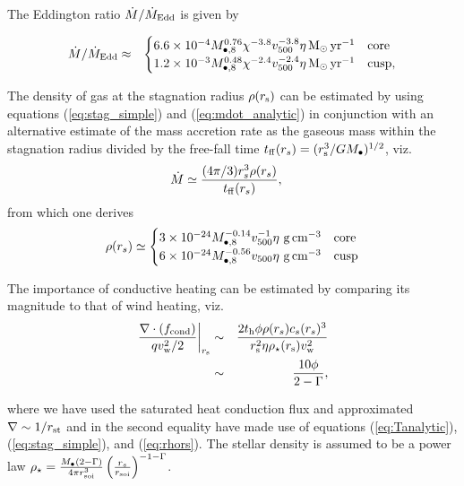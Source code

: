 \documentclass[usenatbib,fleqn]{mn2e}
\newcommand{\eddr}{\dot{M}/\dot{M}_{\rm Edd}}
\newcommand{\rs}{r_s}
\newcommand{\Mbh}[1][]{M_{\bullet#1}}
\newcommand{\Mbheight}{M_{\bullet,8}}
\newcommand{\soi}{\rm soi}
\newcommand{\rsoi}{r_{\soi}}
\newcommand{\ff}{\rm ff}
\newcommand{\pyear}{{\rm yr}^{-1}}
\begin{document}
The Eddington ratio $\eddr$ is given by 

\begin{eqnarray}
\eddr&\approx&
  \begin{cases}
    6.6 \times 10^{-4} M_{\bullet,8}^{0.76}
    \chi^{-3.8} v_{500}^{-3.8}  \eta \Msun \, \pyear& \text{core} \\
    1.2 \times 10^{-3} \Mbheight^{0.48} 
    \chi^{-2.4} v_{500}^{-2.4}  \eta \Msun \, \pyear  & \text{cusp}, 
  \end{cases}
  \label{eq:eddr_analytic}
\end{eqnarray}

The density of gas at the stagnation radius $\rho(r_{\rm s})$ can be estimated by using equations (\ref{eq:stag_simple}) and (\ref{eq:mdot_analytic}) in conjunction with an alternative estimate of the mass accretion rate as the gaseous mass within the stagnation radius divided by the free-fall time $t_{\rm ff}(\rs) = (r_{\rm s}^{3}/GM_{\bullet})^{1/2}$, viz.
\begin{align}
  &\dot{M}\simeq\frac{(4 \pi/3) \rs^3 \rho(\rs)}{t_{\ff}(\rs)},
  \label{eq:mdot_gas}
\end{align}
from which one derives 
\begin{align}
  \rho(\rs)\simeq
  \begin{cases}
    3 \times 10^{-24} \Mbheight^{-0.14} v_{500}^{-1}  \eta \,
    \, {\rm g \, cm^{-3}}& \text{core}\\
    6 \times 10^{-24}  \Mbheight^{-0.56} v_{500}    \eta \,\, {\rm g \,cm^{-3}} & \text{cusp}
  \end{cases}
  \label{eq:rhors}
\end{align}

The importance of conductive heating can be estimated by comparing its
magnitude to that of wind heating, viz.~
\begin{eqnarray} \left.\frac{\nabla\cdot(f_{\rm cond})}{q v_{\rm
w}^{2}/2}\right|_{r_{\rm s}} &\sim& \frac{2t_{\rm h} \phi \rho(\rs) c_s(\rs)^3}{r_{\rm s}^{2}\eta \rho_{\star}(r_{\rm s}) v_{\rm w}^{2}}
\nonumber \\ &\sim&
\frac{10 \phi}{2-\Gamma}, \label{eq:condRatio}
\end{eqnarray}

where we have used the saturated heat conduction flux and approximated
$\nabla \sim 1/r_{\rm st}$ and in the second equality have made use of
equations (\ref{eq:Tanalytic}), (\ref{eq:stag_simple}), and
(\ref{eq:rhors}). The stellar density is assumed to be a power law
$\rho_{\star}=\frac{\Mbh \left(2-\Gamma\right)}{4 \pi \rsoi^3}
\left(\frac{\rs}{\rsoi}\right)^{-1-\Gamma}$.
\end{document}
